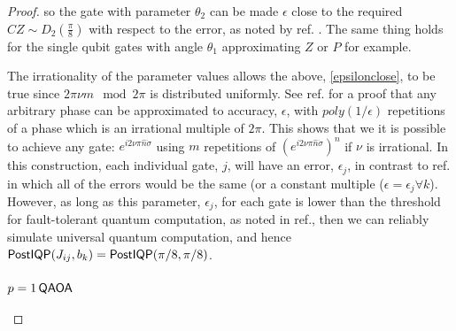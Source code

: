 \begin{proof}
so the gate with parameter $\theta_2$ can be made $\epsilon$ close to the required $CZ \sim D_2(\frac{\pi}{8})$ with respect to the error, as noted by ref. . The same thing holds for the single qubit gates with angle $\theta_1$ approximating $Z$ or $P$ for example.

The irrationality of the parameter values allows the above, \eqref{epsilonclose}, to be true since $2\pi\nu m\mod 2\pi$ is distributed uniformly. See ref. for a proof that any arbitrary phase can be approximated to accuracy, $\epsilon$, with $poly(1/\epsilon)$ repetitions of a phase which is an irrational multiple of $2\pi$. This shows that we it is possible to achieve any gate: $e^{i2\nu\pi \hat{n}\dot\sigma}$ using $m$ repetitions of $(e^{i2\nu\pi \hat{n}\dot\sigma})^n$ if $\nu$ is irrational. In this construction, each individual gate, $j$, will have an error, $\epsilon_j$, in contrast to ref. in which all of the errors would be the same (or a constant multiple ($\epsilon = \epsilon_j \forall k$). However, as long as this parameter, $\epsilon_j$,  for each gate is lower than the threshold for fault-tolerant quantum computation, as noted in ref., then we can reliably simulate universal quantum computation, and hence $\operatorname{\textsf{PostIQP}}( J_{ij}, b_{k}) = \operatorname{\textsf{PostIQP}}(\pi/8, \pi/8)$.

\subsubsection*{\texorpdfstring{$p = 1 \operatorname{\textsf{QAOA}}$}{pQAOA} \label{appa:hardnessqaoaproof}}


\end{proof}
